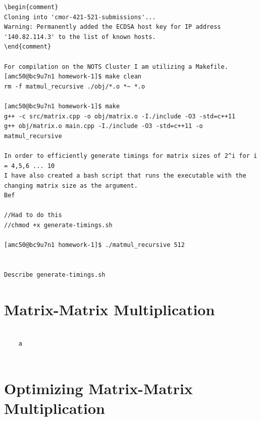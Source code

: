 \documentclass{article}
\begin{document}
\begin{verbatim}
\begin{comment}
Cloning into 'cmor-421-521-submissions'...
Warning: Permanently added the ECDSA host key for IP address '140.82.114.3' to the list of known hosts.
\end{comment}

For compilation on the NOTS Cluster I am utilizing a Makefile.
[amc50@bc9u7n1 homework-1]$ make clean
rm -f matmul_recursive ./obj/*.o *~ *.o

[amc50@bc9u7n1 homework-1]$ make
g++ -c src/matrix.cpp -o obj/matrix.o -I./include -O3 -std=c++11
g++ obj/matrix.o main.cpp -I./include -O3 -std=c++11 -o matmul_recursive

In order to efficiently generate timings for matrix sizes of 2^i for i = 4,5,6 ... 10
I have also created a bash script that runs the executable with the changing matrix size as the argument. 
Bef

//Had to do this
//chmod +x generate-timings.sh

[amc50@bc9u7n1 homework-1]$ ./matmul_recursive 512


Describe generate-timings.sh

\end{verbatim}

\section{Matrix-Matrix Multiplication}
\begin{verbatim}

    a
    
\end{verbatim}

\section{Optimizing Matrix-Matrix Multiplication}
\begin{verbatim}
\end{verbatim}
\end{document}
